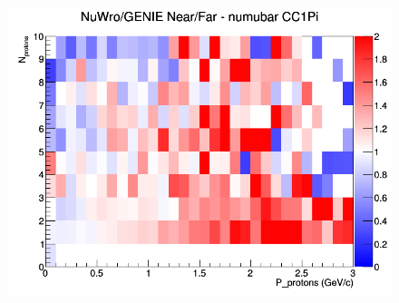 \documentclass[12pt]{article}
\begin{document}
\begin{figure}[h]
\endminipage
{}
\includegraphics[width=\linewidth]{N_P/nominal/protons/ratios/CC1Pi_NuWro_GENIE_numubar_NF_N_P.png}
\endminipage
\newline
\end{figure}
\clearpage
\end{document}
